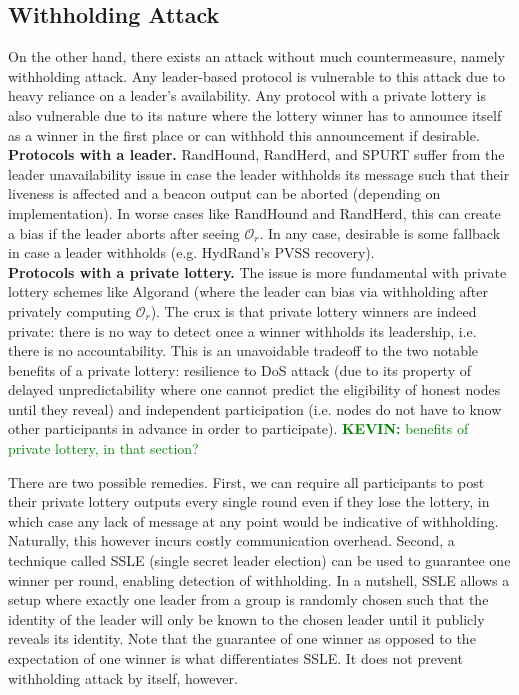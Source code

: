 \documentclass[letterpaper,twocolumn,10pt]{article}
\theoremstyle{definition}
\theoremstyle{remark}
\newcommand{\kevinnote}[1]{\textcolor{green}{\textbf{KEVIN:} #1}}
\begin{document}
\subsection{Withholding Attack}
On the other hand, there exists an attack without much countermeasure, namely withholding attack. Any leader-based protocol is vulnerable to this attack due to heavy reliance on a leader's availability. Any protocol with a private lottery is also vulnerable due to its nature where the lottery winner has to announce itself as a winner in the first place or can withhold this announcement if desirable.\\

\noindent\textbf{Protocols with a leader.} RandHound, RandHerd, and SPURT suffer from the leader unavailability issue in case the leader withholds its message such that their liveness is affected and a beacon output can be aborted (depending on implementation). In worse cases like RandHound and RandHerd, this can create a bias if the leader aborts after seeing $\mathcal{O}_r$. In any case, desirable is some fallback in case a leader withholds (e.g. HydRand's PVSS recovery).\\

\noindent\textbf{Protocols with a private lottery.} The issue is more fundamental with private lottery schemes like Algorand (where the leader can bias via withholding after privately computing $\mathcal{O}_r$). The crux is that private lottery winners are indeed private: there is no way to detect once a winner withholds its leadership, i.e. there is no accountability. This is an unavoidable tradeoff to the two notable benefits of a private lottery: resilience to DoS attack (due to its property of delayed unpredictability \cite{azouvi2018winning} where one cannot predict the eligibility of honest nodes until they reveal) and independent participation (i.e. nodes do not have to know other participants in advance in order to participate). \kevinnote{benefits of private lottery, in that section?}

There are two possible remedies. First, we can require all participants to post their private lottery outputs every single round even if they lose the lottery, in which case any lack of message at any point would be indicative of withholding. Naturally, this however incurs costly communication overhead. Second, a technique called SSLE (single secret leader election) \cite{boneh2020single} can be used to guarantee one winner per round, enabling detection of withholding. In a nutshell, SSLE allows a setup where exactly one leader from a group is randomly chosen such that the identity of the leader will only be known to the chosen leader until it publicly reveals its identity. Note that the guarantee of one winner as opposed to the expectation of one winner is what differentiates SSLE. It does not prevent withholding attack by itself, however.
\end{document}
